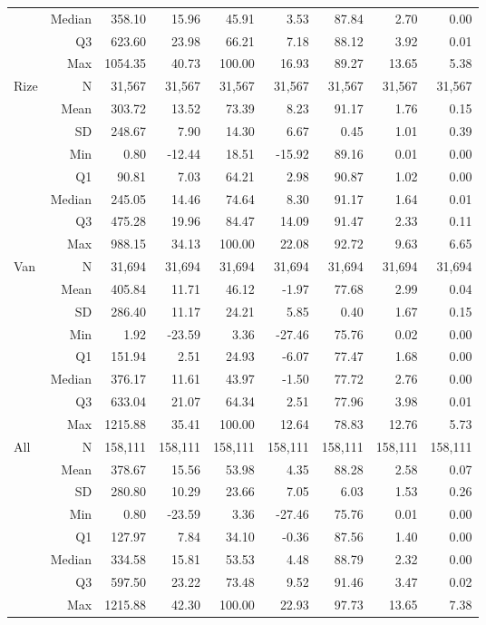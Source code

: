 \begin{table}[htbp]
\begin{tabular}{lrrrrrrrr}
 & Median & 358.10 & 15.96 & 45.91 & 3.53 & 87.84 & 2.70 & 0.00 \\
 & Q3 & 623.60 & 23.98 & 66.21 & 7.18 & 88.12 & 3.92 & 0.01 \\
 & Max & 1054.35 & 40.73 & 100.00 & 16.93 & 89.27 & 13.65 & 5.38 \\
Rize & N & 31,567 & 31,567 & 31,567 & 31,567 & 31,567 & 31,567 & 31,567 \\
 & Mean & 303.72 & 13.52 & 73.39 & 8.23 & 91.17 & 1.76 & 0.15 \\
 & SD & 248.67 & 7.90 & 14.30 & 6.67 & 0.45 & 1.01 & 0.39 \\
 & Min & 0.80 & -12.44 & 18.51 & -15.92 & 89.16 & 0.01 & 0.00 \\
 & Q1 & 90.81 & 7.03 & 64.21 & 2.98 & 90.87 & 1.02 & 0.00 \\
 & Median & 245.05 & 14.46 & 74.64 & 8.30 & 91.17 & 1.64 & 0.01 \\
 & Q3 & 475.28 & 19.96 & 84.47 & 14.09 & 91.47 & 2.33 & 0.11 \\
 & Max & 988.15 & 34.13 & 100.00 & 22.08 & 92.72 & 9.63 & 6.65 \\
Van & N & 31,694 & 31,694 & 31,694 & 31,694 & 31,694 & 31,694 & 31,694 \\
 & Mean & 405.84 & 11.71 & 46.12 & -1.97 & 77.68 & 2.99 & 0.04 \\
 & SD & 286.40 & 11.17 & 24.21 & 5.85 & 0.40 & 1.67 & 0.15 \\
 & Min & 1.92 & -23.59 & 3.36 & -27.46 & 75.76 & 0.02 & 0.00 \\
 & Q1 & 151.94 & 2.51 & 24.93 & -6.07 & 77.47 & 1.68 & 0.00 \\
 & Median & 376.17 & 11.61 & 43.97 & -1.50 & 77.72 & 2.76 & 0.00 \\
 & Q3 & 633.04 & 21.07 & 64.34 & 2.51 & 77.96 & 3.98 & 0.01 \\
 & Max & 1215.88 & 35.41 & 100.00 & 12.64 & 78.83 & 12.76 & 5.73 \\
All & N & 158,111 & 158,111 & 158,111 & 158,111 & 158,111 & 158,111 & 158,111 \\
 & Mean & 378.67 & 15.56 & 53.98 & 4.35 & 88.28 & 2.58 & 0.07 \\
 & SD & 280.80 & 10.29 & 23.66 & 7.05 & 6.03 & 1.53 & 0.26 \\
 & Min & 0.80 & -23.59 & 3.36 & -27.46 & 75.76 & 0.01 & 0.00 \\
 & Q1 & 127.97 & 7.84 & 34.10 & -0.36 & 87.56 & 1.40 & 0.00 \\
 & Median & 334.58 & 15.81 & 53.53 & 4.48 & 88.79 & 2.32 & 0.00 \\
 & Q3 & 597.50 & 23.22 & 73.48 & 9.52 & 91.46 & 3.47 & 0.02 \\
 & Max & 1215.88 & 42.30 & 100.00 & 22.93 & 97.73 & 13.65 & 7.38 \\
\hline
\end{tabular}
\end{table}
